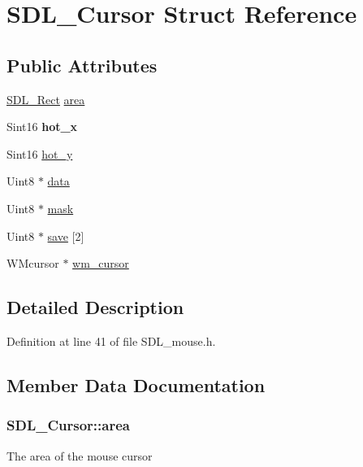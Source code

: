 \hypertarget{structSDL__Cursor}{\section{S\+D\+L\+\_\+\+Cursor Struct Reference}
\label{structSDL__Cursor}
}
\subsection*{Public Attributes}
\begin{DoxyCompactItemize}
\item 
\hyperlink{structSDL__Rect}{S\+D\+L\+\_\+\+Rect} \hyperlink{structSDL__Cursor_afefd14bbad7b59dbf22d63352ced7378}{area}
\item 
\hypertarget{structSDL__Cursor_a9560ccf14c4b7eb5dd905c6af57ba3e1}{Sint16 {\bfseries hot\+\_\+x}}\label{structSDL__Cursor_a9560ccf14c4b7eb5dd905c6af57ba3e1}

\item 
Sint16 \hyperlink{structSDL__Cursor_a154ec5999705b912aa09b1f1bacb3275}{hot\+\_\+y}
\item 
Uint8 $\ast$ \hyperlink{structSDL__Cursor_ae7f8c81028205f9359f0171f2a82ec04}{data}
\item 
Uint8 $\ast$ \hyperlink{structSDL__Cursor_afaec3f604b8a83986bab02eee024c5eb}{mask}
\item 
Uint8 $\ast$ \hyperlink{structSDL__Cursor_a44a8edebf057e76e048512a57c5630e0}{save} \mbox{[}2\mbox{]}
\item 
W\+Mcursor $\ast$ \hyperlink{structSDL__Cursor_ab133c48a66abe3831e5ad18467d9ef3d}{wm\+\_\+cursor}
\end{DoxyCompactItemize}


\subsection{Detailed Description}


Definition at line 41 of file S\+D\+L\+\_\+mouse.\+h.



\subsection{Member Data Documentation}
\hypertarget{structSDL__Cursor_afefd14bbad7b59dbf22d63352ced7378}{
\subsubsection[{area}]{ S\+D\+L\+\_\+\+Cursor\+::area}}\label{structSDL__Cursor_afefd14bbad7b59dbf22d63352ced7378}
The area of the mouse cursor 

